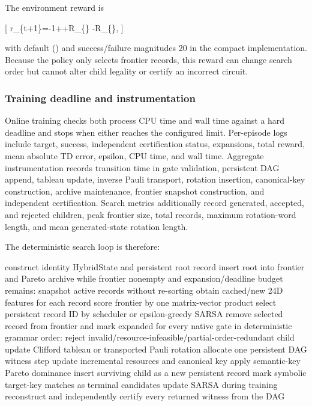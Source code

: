 \documentclass[
]{article}
\newenvironment{Shaded}{}{}
\newcommand{\NormalTok}[1]{#1}
\begin{document}
The environment reward is

{[}
r\_\{t+1\}=-1++R\_\{\}\mathbf 1{[}\mathrm{success}{]}
-R\_\{\}\mathbf 1{[}\mathrm{exhausted\ or\ truncated}{]},
 {]}

with default () and success/failure magnitudes 20 in the
compact implementation. Because the policy only selects frontier
records, this reward can change search order but cannot alter child
legality or certify an incorrect circuit.

\hypertarget{training-deadline-and-instrumentation}{%
\subsubsection{Training deadline and
instrumentation}\label{training-deadline-and-instrumentation}}

Online training checks both process CPU time and wall time against a
hard deadline and stops when either reaches the configured limit.
Per-episode logs include target, success, independent certification
status, expansions, total reward, mean absolute TD error, epsilon, CPU
time, and wall time. Aggregate instrumentation records transition time
in gate validation, persistent DAG append, tableau update, inverse Pauli
transport, rotation insertion, canonical-key construction, archive
maintenance, frontier snapshot construction, and independent
certification. Search metrics additionally record generated, accepted,
and rejected children, peak frontier size, total records, maximum
rotation-word length, and mean generated-state rotation length.

The deterministic search loop is therefore:

\begin{Shaded}
\begin{Highlighting}[]
\NormalTok{construct identity HybridState and persistent root record}
\NormalTok{insert root into frontier and Pareto archive}
\NormalTok{while frontier nonempty and expansion/deadline budget remains:}
\NormalTok{    snapshot active records without re{-}sorting}
\NormalTok{    obtain cached/new 24D features for each record}
\NormalTok{    score frontier by one matrix{-}vector product}
\NormalTok{    select persistent record ID by scheduler or epsilon{-}greedy SARSA}
\NormalTok{    remove selected record from frontier and mark expanded}
\NormalTok{    for every native gate in deterministic grammar order:}
\NormalTok{        reject invalid/resource{-}infeasible/partial{-}order{-}redundant child}
\NormalTok{        update Clifford tableau or transported Pauli rotation}
\NormalTok{        allocate one persistent DAG witness step}
\NormalTok{        update incremental resources and canonical key}
\NormalTok{        apply semantic{-}key Pareto dominance}
\NormalTok{        insert surviving child as a new persistent record}
\NormalTok{        mark symbolic target{-}key matches as terminal candidates}
\NormalTok{    update SARSA during training}
\NormalTok{reconstruct and independently certify every returned witness from the DAG}
\end{Highlighting}
\end{Shaded}
\end{document}
